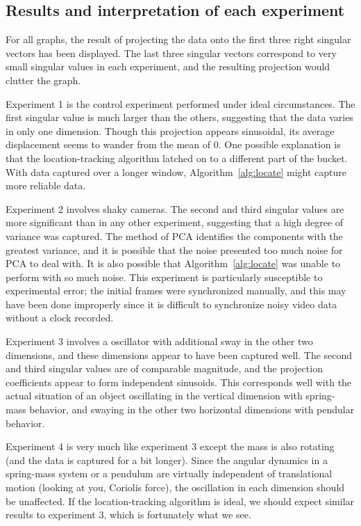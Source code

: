 \documentclass{article}
\begin{document}
\subsection{Results and interpretation of each experiment}
For all graphs, the result of projecting the data onto the first three right singular vectors has been displayed. The last three singular vectors correspond to very small singular values in each experiment, and the resulting projection would clutter the graph.

Experiment 1 is the control experiment performed under ideal circumstances. The first singular value is much larger than the others, suggesting that the data varies in only one dimension. Though this projection appears sinusoidal, its average displacement seems to wander from the mean of $0$. One possible explanation is that the location-tracking algorithm latched on to a different part of the bucket. With data captured over a longer window, Algorithm~\ref{alg:locate} might capture more reliable data.

Experiment 2 involves shaky cameras. The second and third singular values are more significant than in any other experiment, suggesting that a high degree of variance was captured. The method of PCA identifies the components with the greatest variance, and it is possible that the noise presented too much noise for PCA to deal with. It is also possible that Algorithm~\ref{alg:locate} was unable to perform with so much noise. This experiment is particularly susceptible to experimental error; the initial frames were synchronized manually, and this may have been done improperly since it is difficult to synchronize noisy video data without a clock recorded.

Experiment 3 involves a oscillator with additional sway in the other two dimensions, and these dimensions appear to have been captured well. The second and third singular values are of comparable magnitude, and the projection coefficients appear to form independent sinusoids. This corresponds well with the actual situation of an object oscillating in the vertical dimension with spring-mass behavior, and swaying in the other two horizontal dimensions with pendular behavior.

Experiment 4 is very much like experiment 3 except the mass is also rotating (and the data is captured for a bit longer). Since the angular dynamics in a spring-mass system or a pendulum are virtually independent of translational motion (looking at you, Coriolis force), the oscillation in each dimension should be unaffected. If the location-tracking algorithm is ideal, we should expect similar results to experiment 3, which is fortunately what we see.
\end{document}
